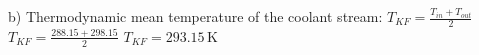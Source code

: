 b) Thermodynamic mean temperature of the coolant stream:  
\( T_{KF} = \frac{T_{in} + T_{out}}{2} \)  
\( T_{KF} = \frac{288.15 + 298.15}{2} \)  
\( T_{KF} = 293.15 \, \text{K} \)